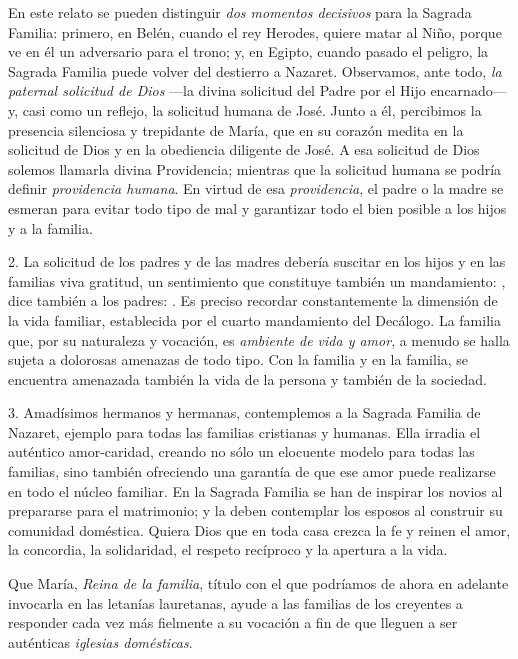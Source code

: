 \begin{body}
\begin{body}
En este relato se pueden distinguir \emph{dos momentos decisivos} para la Sagrada Familia: primero, en Belén, cuando el rey Herodes, quiere matar al Niño, porque ve en él un adversario para el trono; y, en Egipto, cuando pasado el peligro, la Sagrada Familia puede volver del destierro a Nazaret. Observamos, ante todo, \emph{la paternal solicitud de Dios} ---la divina solicitud del Padre por el Hijo encarnado--- y, casi como un reflejo, la solicitud humana de José. Junto a él, percibimos la presencia silenciosa y trepidante de María, que en su corazón medita en la solicitud de Dios y en la obediencia diligente de José. A esa solicitud de Dios solemos llamarla divina Providencia; mientras que la solicitud humana se podría definir \emph{providencia humana}. En virtud de esa \emph{providencia}, el padre o la madre se esmeran para evitar todo tipo de mal y garantizar todo el bien posible a los hijos y a la familia.

2. La solicitud de los padres y de las madres debería suscitar en los hijos y en las familias viva gratitud, un sentimiento que constituye también un mandamiento: , dice también a los padres: . Es preciso recordar constantemente la dimensión de la vida familiar, establecida por el cuarto mandamiento del Decálogo. La familia que, por su naturaleza y vocación, es \emph{ambiente de vida y amor}, a menudo se halla sujeta a dolorosas amenazas de todo tipo. Con la familia y en la familia, se encuentra amenazada también la vida de la persona y también de la sociedad.

3. Amadísimos hermanos y hermanas, contemplemos a la Sagrada Familia de Nazaret, ejemplo para todas las familias cristianas y humanas. Ella irradia el auténtico amor-caridad, creando no sólo un elocuente modelo para todas las familias, sino también ofreciendo una garantía de que ese amor puede realizarse en todo el núcleo familiar. En la Sagrada Familia se han de inspirar los novios al prepararse para el matrimonio; y la deben contemplar los esposos al construir su comunidad doméstica. Quiera Dios que en toda casa crezca la fe y reinen el amor, la concordia, la solidaridad, el respeto recíproco y la apertura a la vida.

Que María, \emph{Reina de la familia}, título con el que podríamos de ahora en adelante invocarla en las letanías lauretanas, ayude a las familias de los creyentes a responder cada vez más fielmente a su vocación a fin de que lleguen a ser auténticas \emph{iglesias domésticas}.


\end{body}
\end{body}
